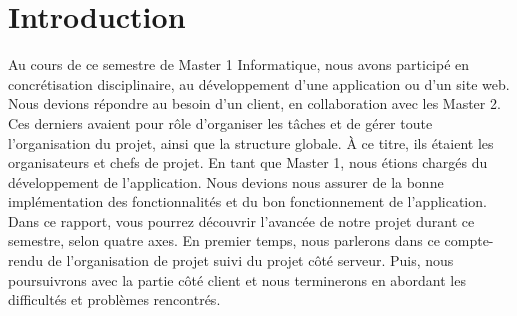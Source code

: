 \chapter*{Introduction}

Au cours de ce semestre de Master 1 Informatique, nous avons participé en concrétisation disciplinaire, au développement d'une application ou d'un site web. Nous devions répondre au besoin d'un client, en collaboration avec les Master 2. Ces derniers avaient pour rôle d'organiser les tâches et de gérer toute l'organisation du projet, ainsi que la structure globale. À ce titre, ils étaient les organisateurs et chefs de projet.
En tant que Master 1, nous étions chargés du développement de l'application. Nous devions nous assurer de la bonne implémentation des fonctionnalités et du bon fonctionnement de l'application.
Dans ce rapport, vous pourrez découvrir l'avancée de notre projet durant ce semestre, selon quatre axes. En premier temps, nous parlerons dans ce compte-rendu de l'organisation de projet suivi du projet côté serveur. Puis, nous poursuivrons avec la partie côté client et nous terminerons en abordant les difficultés et problèmes rencontrés.


